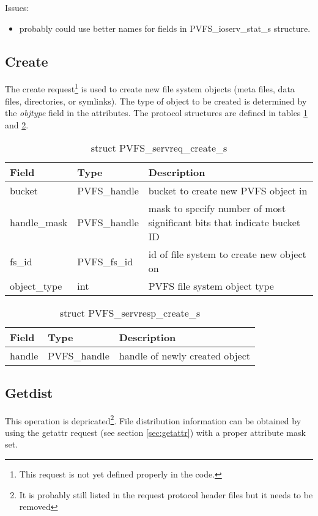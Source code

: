 \documentclass[11pt, letterpaper]{article} %
\begin{document}
Issues:
\begin{itemize}
\item probably could use better names for fields in
PVFS\_ioserv\_stat\_s structure.
\end{itemize}

\subsection{Create}

The create request\footnote{This request is not yet defined properly in
the code.}
is used to create new file system objects (meta
files, data files, directories, or symlinks).  The type of object to be
created is determined by the \emph{objtype} field in the attributes.
The protocol structures
are defined in tables \ref{tab:reqcreate} and \ref{tab:respcreate}.

\begin{table}[H]
\begin{tabular}{|l|l|l|}
\hline
Field & Type & Description \\
\hline
\hline
bucket & PVFS\_handle & bucket to create new PVFS object in\\
\hline
handle\_mask & PVFS\_handle & mask to specify number of most significant
bits that indicate bucket ID\\
\hline
fs\_id & PVFS\_fs\_id & id of file system to create new object on\\
\hline
object\_type & int & PVFS file system object type\\
\hline
\end{tabular}
\caption{struct PVFS\_servreq\_create\_s \label{tab:reqcreate}}
\end{table}

\begin{table}[H]
\begin{tabular}{|l|l|l|}
\hline
Field & Type & Description \\
\hline
\hline
handle & PVFS\_handle & handle of newly created object\\
\hline
\end{tabular}
\caption{struct PVFS\_servresp\_create\_s \label{tab:respcreate}}
\end{table}


\subsection{Getdist}

This operation is depricated\footnote{It is probably still listed in
the request protocol header files but it needs to be removed}.  File
distribution information can be obtained by using the getattr request
(see section \ref{sec:getattr}) with a proper attribute mask set.
\end{document}
